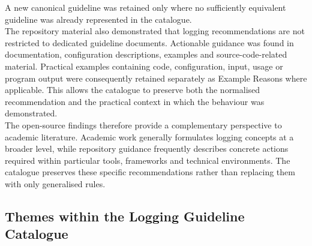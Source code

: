A new canonical guideline was retained only where no sufficiently equivalent guideline was already represented in the catalogue.
\\
The repository material also demonstrated that logging recommendations are not restricted to dedicated 
guideline documents. Actionable guidance was found in documentation, configuration descriptions, 
examples and source-code-related material. Practical examples containing code, configuration, input, 
usage or program output were consequently retained separately as Example Reasons where applicable. 
This allows the catalogue to preserve both the normalised recommendation and the practical context in which the behaviour was demonstrated.
\\
The open-source findings therefore provide a complementary perspective to academic literature. 
Academic work generally formulates logging concepts at a broader level, while repository guidance 
frequently describes concrete actions required within particular tools, frameworks and technical environments. 
The catalogue preserves these specific recommendations rather than replacing them with only generalised rules.

\subsection{Themes within the Logging Guideline Catalogue}

